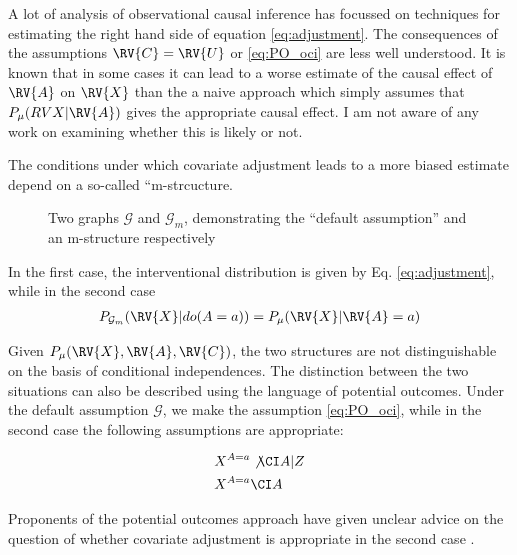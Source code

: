A lot of analysis of observational causal inference has focussed on techniques for estimating the right hand side of equation \ref{eq:adjustment}. The consequences of the assumptions $\RV{C}=\RV{U}$ or \ref{eq:PO_oci} are less well understood. It is known that in some cases it can lead to a worse estimate of the causal effect of $\RV{A}$ on $\RV{X}$ than the a naive approach which simply assumes that $P_\mu(RV{X}|\RV{A})$ gives the appropriate causal effect. I am not aware of any work on examining whether this is likely or not.

The conditions under which covariate adjustment leads to a more biased estimate depend on a so-called ``m-strcucture.
\begin{figure}[ht]
    \centering
    \caption{Two graphs $\mathcal{G}$ and $\mathcal{G}_m$, demonstrating the ``default assumption'' and an m-structure respectively}
    \label{fig:my_label}
\end{figure}


In the first case, the interventional distribution is given by Eq. \ref{eq:adjustment}, while in the second case 
\begin{align}
    P_{\mathcal{G}_m}(\RV{X}|do(A=a))&=P_\mu(\RV{X}|\RV{A}=a) \label{eq:m_structure}\\
\end{align}

Given $P_\mu(\RV{X},\RV{A},\RV{C})$, the two structures are not distinguishable on the basis of conditional independences. The distinction between the two situations can also be described using the language of potential outcomes\cite{sjolander_propensity_2009}. Under the default assumption $\mathcal{G}$, we make the assumption \ref{eq:PO_oci}, while in the second case the following assumptions are appropriate:

\begin{align}
    X^{A=a} &\not\CI A | Z \label{eq:mstruc_po3}\\
    X^{A=a} &\CI A \label{eq:mstruc_po4}
\end{align}

Proponents of the potential outcomes approach have given unclear advice on the question of whether covariate adjustment is appropriate in the second case \cite{rubin_authors_2008}\cite{noauthor_resolving_2009}. 